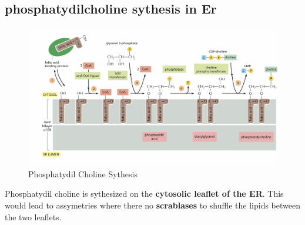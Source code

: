 \documentclass[../main.tex]{subfiles}
\begin{document}
\subsection{phosphatydilcholine sythesis in Er}
\begin{figure}[H]
    \centering
    \includegraphics[width=0.5\linewidth]{phosphatydilCholineSynthesis.png}
    \caption{Phosphatydil Choline Sythesis}
    \label{fig:enter-label}
\end{figure}
Phosphatydil choline is sythesized on the \textbf{cytosolic leaflet of the ER}. This would lead to assymetries where there no \textbf{scrablases} to shuffle the lipids between the two leaflets.


\printglossaries
\end{document}
